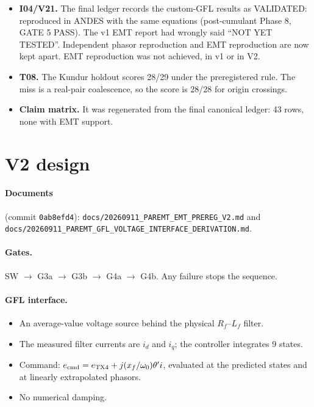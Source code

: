 \documentclass[10pt,a4paper]{article}
\newcommand{\f}[1]{\nolinkurl{#1}}
\begin{document}
\begin{itemize}
\item \textbf{I04/V21.} The final ledger records the custom-GFL results as
  VALIDATED: reproduced in ANDES with the same equations (post-cumulant Phase 8,
  GATE 5 PASS). The v1 EMT report had wrongly said ``NOT YET TESTED''.
  Independent phasor reproduction and EMT reproduction are now kept apart. EMT
  reproduction was not achieved, in v1 or in V2.
\item \textbf{T08.} The Kundur holdout scores 28/29 under the preregistered rule.
  The miss is a real-pair coalescence, so the score is 28/28 for origin
  crossings.
\item \textbf{Claim matrix.} It was regenerated from the final canonical ledger:
  43 rows, none with EMT support.
\end{itemize}

\section{V2 design}

\paragraph{Documents} (commit \texttt{0ab8efd4}):
\f{docs/20260911_PAREMT_EMT_PREREG_V2.md} and
\f{docs/20260911_PAREMT_GFL_VOLTAGE_INTERFACE_DERIVATION.md}.

\paragraph{Gates.} SW $\to$ G3a $\to$ G3b $\to$ G4a $\to$ G4b. Any failure stops
the sequence.

\paragraph{GFL interface.}
\begin{itemize}
\item An average-value voltage source behind the physical $R_f$--$L_f$ filter.
\item The measured filter currents are $i_d$ and $i_q$; the controller
  integrates 9 states.
\item Command: $e_{\rm cmd}=e_{\rm TX4}+j(x_f/\omega_0)\theta' i$, evaluated at
  the predicted states and at linearly extrapolated phasors.
\item No numerical damping.
\end{itemize}
\end{document}
